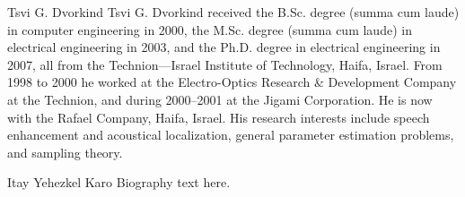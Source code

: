 \documentclass[journal]{IEEEtran}
\begin{document}
\begin{IEEEbiography}{Tsvi G. Dvorkind}
Tsvi G. Dvorkind received the B.Sc. degree (summa cum laude) in computer engineering in 2000, the M.Sc. degree (summa cum laude) in electrical engineering in 2003, and the Ph.D. degree in electrical engineering in 2007, all from the Technion—Israel Institute of Technology, Haifa, Israel.
From 1998 to 2000 he worked at the Electro-Optics Research & Development Company at the Technion, and during 2000–2001 at the Jigami Corporation.
He is now with the Rafael Company, Haifa, Israel.
His research interests include speech enhancement and acoustical localization, general parameter estimation problems, and sampling theory.
\end{IEEEbiography}
\begin{IEEEbiography}{Itay Yehezkel Karo}
Biography text here.
\end{IEEEbiography}
\end{document}
